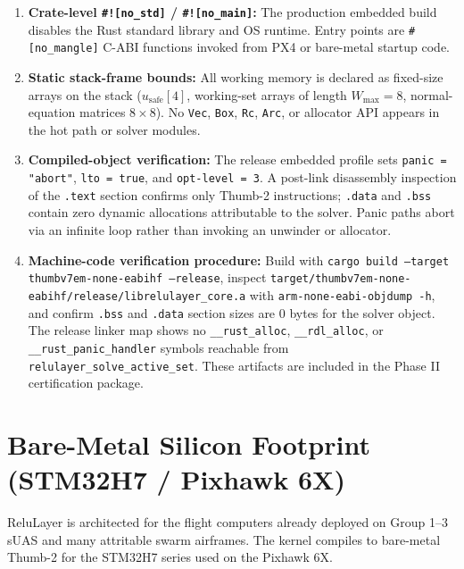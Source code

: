 \documentclass[11pt]{article}
\begin{document}
\begin{enumerate}[leftmargin=*]
    \item \textbf{Crate-level \texttt{\#![no\_std]} / \texttt{\#![no\_main]}:} The production embedded build disables the Rust standard library and OS runtime. Entry points are \texttt{\#[no\_mangle]} C-ABI functions invoked from PX4 or bare-metal startup code.
    \item \textbf{Static stack-frame bounds:} All working memory is declared as fixed-size arrays on the stack ($u_{\text{safe}}[4]$, working-set arrays of length $W_{\max} = 8$, normal-equation matrices $8 \times 8$). No \texttt{Vec}, \texttt{Box}, \texttt{Rc}, \texttt{Arc}, or allocator API appears in the hot path or solver modules.
    \item \textbf{Compiled-object verification:} The release embedded profile sets \texttt{panic = "abort"}, \texttt{lto = true}, and \texttt{opt-level = 3}. A post-link disassembly inspection of the \texttt{.text} section confirms only Thumb-2 instructions; \texttt{.data} and \texttt{.bss} contain zero dynamic allocations attributable to the solver. Panic paths abort via an infinite loop rather than invoking an unwinder or allocator.
    \item \textbf{Machine-code verification procedure:} Build with \texttt{cargo build --target thumbv7em-none-eabihf --release}, inspect \texttt{target/thumbv7em-none-eabihf/release/librelulayer\_core.a} with \texttt{arm-none-eabi-objdump -h}, and confirm \texttt{.bss} and \texttt{.data} section sizes are 0 bytes for the solver object. The release linker map shows no \texttt{\_\_rust\_alloc}, \texttt{\_\_rdl\_alloc}, or \texttt{\_\_rust\_panic\_handler} symbols reachable from \texttt{relulayer\_solve\_active\_set}. These artifacts are included in the Phase II certification package.
\end{enumerate}

\section{Bare-Metal Silicon Footprint (STM32H7 / Pixhawk 6X)}
\label{sec:footprint}

ReluLayer is architected for the flight computers already deployed on Group 1--3 sUAS and many attritable swarm airframes. The kernel compiles to bare-metal Thumb-2 for the STM32H7 series used on the Pixhawk 6X.
\end{document}
